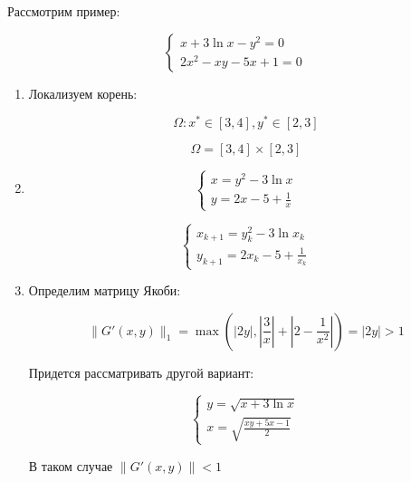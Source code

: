 \documentclass[10pt,a4paper]{article}
\begin{document}
		Рассмотрим пример:
		
		\begin{equation}
			\begin{cases}
				x + 3\ln x - y^{2} = 0
				\\
				2x^{2} - xy - 5x + 1 = 0
			\end{cases}
		\end{equation}
		
		\begin{enumerate}
			\item Локализуем корень:
			
			\begin{equation}
				\Omega: x^{*} \in \left[3, 4\right], y^{*} \in \left[2, 3\right]
			\end{equation}
			
			\begin{equation}
				\Omega = \left[3, 4\right] \times \left[2, 3\right]
			\end{equation}
			
			\item 
			\begin{equation}
				\begin{cases}
					x = y^{2} - 3\ln x
					\\
					y = 2x - 5 + \frac{1}{x}
				\end{cases}
			\end{equation}
			
			\begin{equation}
				\begin{cases}
					x_{k + 1} = y_{k}^{2} - 3\ln x_{k}
					\\
					y_{k + 1} = 2x_{k} - 5 + \frac{1}{x_{k}}
				\end{cases}
			\end{equation}
			
			\item Определим матрицу Якоби:
			
			\begin{equation}
				\parallel G'\left(x, y\right)\parallel_{1} = \max 
				\left(\left|2y\right|, \left|\frac{3}{x}\right| + 
				\left|2 - \frac{1}{x^{2}}\right|\right) = \left|2y\right| > 1
			\end{equation}
			
			Придется рассматривать другой вариант:
			
			\begin{equation}
				\begin{cases}
					y = \sqrt{x + 3\ln x}
					\\
					x = \sqrt{\frac{xy + 5x - 1}{2}}
				\end{cases}
			\end{equation}
			
			В таком случае $\parallel G'\left(x, y\right)\parallel < 1$
		\end{enumerate}
		
\end{document}
